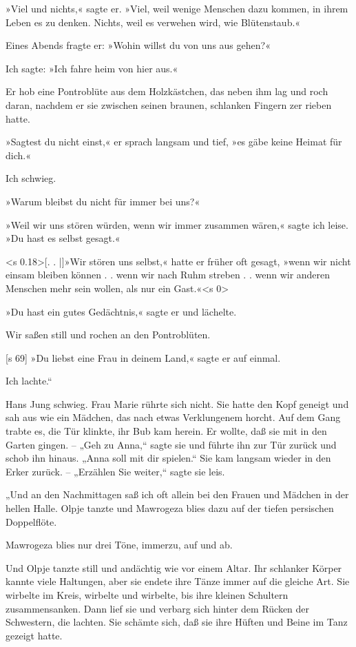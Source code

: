 »Viel und nichts,« sagte er. »Viel, weil wenige
Menschen dazu kommen, in ihrem Leben es zu denken.
Nichts, weil es verwehen wird, wie Blütenstaub.«

Eines Abends fragte er: »Wohin willst du von
uns aus gehen?«

Ich sagte: »Ich fahre heim von hier aus.«

Er hob eine Pontroblüte aus dem Holzkästchen,
das neben ihm lag und roch daran, nachdem er sie
zwischen seinen braunen, schlanken Fingern zer­
rieben hatte.

»Sagtest du nicht einst,« er sprach langsam und
tief, »es gäbe keine Heimat für dich.«

Ich schwieg.

»Warum bleibst du nicht für immer bei uns?«

»Weil wir uns stören würden, wenn wir immer
zusammen wären,« sagte ich leise. »Du hast es
selbst gesagt.«

<s 0.18>[. . |]»Wir stören uns selbst,« hatte er früher oft
gesagt, »wenn wir nicht einsam bleiben können . .
wenn wir nach Ruhm streben . . wenn wir anderen
Menschen mehr sein wollen, als nur ein Gast.«<s 0>

»Du hast ein gutes Gedächtnis,« sagte er und
lächelte.

Wir saßen still und rochen an den Pontroblüten.

[s 69]
»Du liebst eine Frau in deinem Land,« sagte
er auf einmal.

Ich lachte.“

Hans Jung schwieg. Frau Marie rührte sich
nicht. Sie hatte den Kopf geneigt und sah aus wie
ein Mädchen, das nach etwas Verklungenem horcht.
Auf dem Gang trabte es, die Tür klinkte, ihr Bub
kam herein. Er wollte, daß sie mit in den Garten
gingen. – „Geh zu Anna,“ sagte sie und führte
ihn zur Tür zurück und schob ihn hinaus. „Anna soll
mit dir spielen.“ Sie kam langsam wieder in den
Erker zurück. – „Erzählen Sie weiter,“ sagte sie leis.

„Und an den Nachmittagen saß ich oft allein
bei den Frauen und Mädchen in der hellen Halle.
Olpje tanzte und Mawrogeza blies dazu auf der
tiefen persischen Doppelflöte.

Mawrogeza blies nur drei Töne, immerzu, auf
und ab.

Und Olpje tanzte still und andächtig wie vor
einem Altar. Ihr schlanker Körper kannte viele
Haltungen, aber sie endete ihre Tänze immer auf
die gleiche Art. Sie wirbelte im Kreis, wirbelte und
wirbelte, bis ihre kleinen Schultern zusammensanken.
Dann lief sie und verbarg sich hinter dem Rücken
der Schwestern, die lachten. Sie schämte sich, daß
sie ihre Hüften und Beine im Tanz gezeigt hatte.

